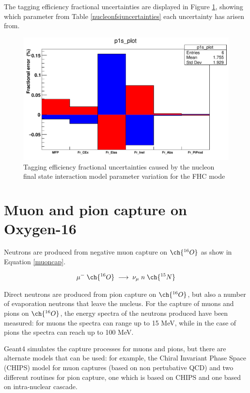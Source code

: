 The tagging efficiency fractional uncertainties are displayed in Figure \ref{fig:nucleonfsiuncertainty}, showing which parameter from Table \ref{nucleonfsiuncertainties} each uncertainty has arisen from.

\begin{figure}[H]
    \includegraphics[scale=0.4]{Figures/nucleonfsi_uncertainty.png}
\caption{Tagging efficiency fractional uncertainties caused by the nucleon final state interaction model parameter variation for the FHC mode}
\label{fig:nucleonfsiuncertainty}
\end{figure}

\section{Muon and pion capture on Oxygen-16}

Neutrons are produced from negative muon capture on $\ch{^{16}O}$ as show in Equation \ref{muoncap}.

\begin{equation}
        \mu^{-}\;\ch{^{16}{O}}\;\longrightarrow\;\nu_{\mu}\;n\;\ch{^{15}{N}}
\label{muoncap}
\end{equation}

Direct neutrons are produced from pion capture on $\ch{^{16}O}$, but also a number of evaporation neutrons that leave the nucleus. For the capture of muons and pions on $\ch{^{16}O}$, the energy spectra of the neutrons produced have been measured: for muons the spectra can range up to 15 MeV, while in the case of pions the spectra can reach up to 100 MeV.


Geant4 simulates the capture processes for muons and pions, but there are alternate models that can be used: for example, the Chiral Invariant Phase Space (CHIPS) model for muon captures (based on non pertubative QCD) and two different routines for pion capture, one which is based on CHIPS and one based on intra-nuclear cascade.

